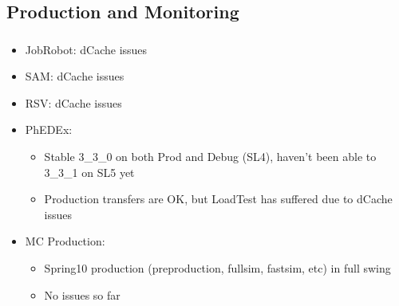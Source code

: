 \documentclass{beamer}
\begin{document}
\subsection{Production and Monitoring}
\begin{frame}
\frametitle{}

\begin{itemize}
	\item JobRobot: dCache issues
	\item SAM: dCache issues
	\item RSV: dCache issues
	\item PhEDEx:
	\begin{itemize}
		\item Stable 3\_3\_0 on both Prod and Debug (SL4), haven't been able to 3\_3\_1 on SL5 yet
		\item Production transfers are OK, but LoadTest has suffered due to dCache issues
	\end{itemize}
	\item MC Production:
	\begin{itemize}
		\item Spring10 production (preproduction, fullsim, fastsim, etc) in full swing
		\item No issues so far
	\end{itemize}
\end{itemize}
\end{frame}
\end{document}
